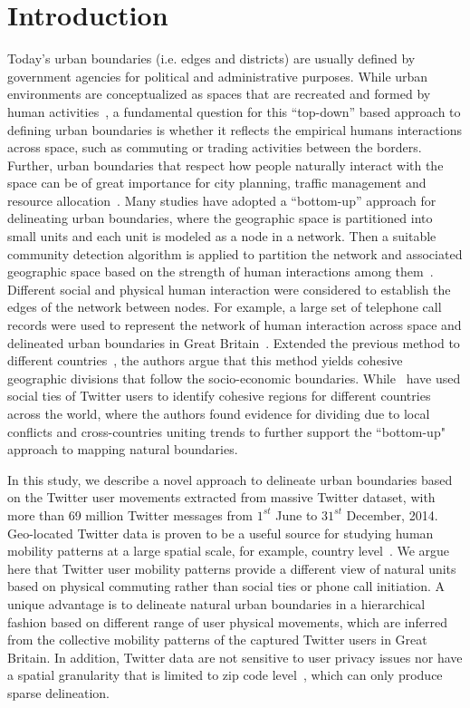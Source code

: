 \documentclass[10pt,letterpaper]{article}
\begin{document}
\section*{Introduction}
Today’s urban boundaries (i.e. edges and districts) are usually defined by government agencies for political and administrative purposes.
While urban environments are conceptualized as spaces that are recreated and formed by human activities~\cite{schliephake}, a fundamental question for this “top-down” based approach to defining urban boundaries is whether it reflects the empirical humans interactions across space, such as commuting or trading activities between the borders.
Further, urban boundaries that respect how people naturally interact with the space can be of great importance for city planning, traffic management and resource allocation~\cite{lynch1960,jiang2015,liu2015,long2015}.
Many studies have adopted a ``bottom-up” approach for delineating urban boundaries, where the geographic space is partitioned into small units and each unit is modeled as a node in a network.
Then a suitable community detection algorithm is applied to partition the network and associated geographic space based on the strength of human interactions among them~\cite{lancichinetti2009}.
Different social and physical human interaction were considered to establish the edges of the network between nodes.
For example, a large set of telephone call records were used to represent the network of human interaction across space and delineated urban boundaries in Great Britain~\cite{ratti2010}.
Extended the previous method to different countries~\cite{sobolevsky2013}, the authors argue that this method yields cohesive geographic divisions that follow the socio-economic boundaries. 
While~\cite{kallus2015} have used social ties of Twitter users to identify cohesive regions for different countries across the world, where the authors found evidence for dividing due to local conflicts and cross-countries uniting trends to further support the ``bottom-up" approach to mapping natural boundaries.

In this study, we describe a novel approach to delineate urban boundaries based on the Twitter user movements extracted from massive Twitter dataset, with more than 69 million Twitter messages from $1^{st}$ June to $31^{st}$ December, 2014.
Geo-located Twitter data is proven to be a useful source for studying human mobility patterns at a large spatial scale, for example, country level~\cite{hawelka,jurdak2015}.
We argue here that Twitter user mobility patterns provide a different view of natural units based on physical commuting rather than social ties or phone call initiation. 
A unique advantage is to delineate natural urban boundaries in a hierarchical fashion based on different range of user physical movements, which are inferred from the collective mobility patterns of the captured Twitter users in Great Britain. 
In addition, Twitter data are not sensitive to user privacy issues nor have a spatial granularity that is limited to zip code level~\cite{thiemann}, which can only produce sparse delineation.
\end{document}
